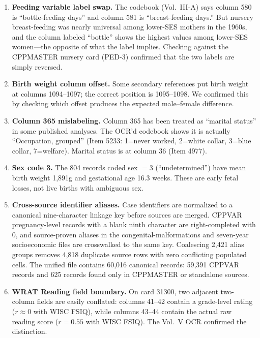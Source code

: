 \documentclass[12pt]{article}
\begin{document}
\begin{enumerate}
    \item \textbf{Feeding variable label swap.} The codebook (Vol.\ III-A) says column 580 is ``bottle-feeding days'' and column 581 is ``breast-feeding days.'' But nursery breast-feeding was nearly universal among lower-SES mothers in the 1960s, and the column labeled ``bottle'' shows the highest values among lower-SES women---the opposite of what the label implies. Checking against the CPPMASTER nursery card (PED-3) confirmed that the two labels are simply reversed.

    \item \textbf{Birth weight column offset.} Some secondary references put birth weight at columns 1094--1097; the correct position is 1095--1098. We confirmed this by checking which offset produces the expected male--female difference.

    \item \textbf{Column 365 mislabeling.} Column 365 has been treated as ``marital status'' in some published analyses. The OCR'd codebook shows it is actually ``Occupation, grouped'' (Item 5233: 1=never worked, 2=white collar, 3=blue collar, 7=welfare). Marital status is at column 36 (Item 4977).

    \item \textbf{Sex code 3.} The 804 records coded sex $= 3$ (``undetermined'') have mean birth weight 1,891g and gestational age 16.3 weeks. These are early fetal losses, not live births with ambiguous sex.

    \item \textbf{Cross-source identifier aliases.} Case identifiers are normalized to a canonical nine-character linkage key before sources are merged. CPPVAR pregnancy-level records with a blank ninth character are right-completed with 0, and source-proven aliases in the congenital-malformations and seven-year socioeconomic files are crosswalked to the same key. Coalescing 2,421 alias groups removes 4,818 duplicate source rows with zero conflicting populated cells. The unified file contains 60,016 canonical records: 59,391 CPPVAR records and 625 records found only in CPPMASTER or standalone sources.

    \item \textbf{WRAT Reading field boundary.} On card 31300, two adjacent two-column fields are easily conflated: columns 41--42 contain a grade-level rating ($r \approx 0$ with WISC FSIQ), while columns 43--44 contain the actual raw reading score ($r = 0.55$ with WISC FSIQ). The Vol.\ V OCR confirmed the distinction.
\end{enumerate}
\end{document}
